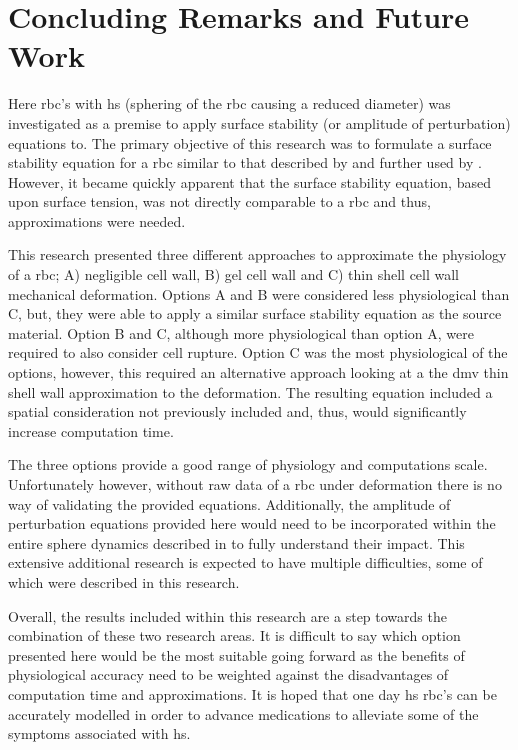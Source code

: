 \section{Concluding Remarks and Future Work}
Here \ac{rbc}'s with \acf{hs} (sphering of the \ac{rbc} causing a reduced diameter) was investigated as a premise to apply surface stability (or amplitude of perturbation) equations to. The primary objective of this research was to formulate a surface stability equation for a \ac{rbc} similar to that described by \citet{Prosperetti1974} and further used by \citet{Zeng2018}. However, it became quickly apparent that the surface stability equation, based upon surface tension, was not directly comparable to a \ac{rbc} and thus, approximations were needed.

This research presented three different approaches to approximate the physiology of a \ac{rbc}; A) negligible cell wall, B) gel cell wall and C) thin shell cell wall mechanical deformation. Options A and B were considered less physiological than C, but, they were able to apply a similar surface stability equation as the source material. Option B and C, although more physiological than option A, were required to also consider cell rupture. Option C was the most physiological of the options, however, this required an alternative approach looking at a the \acf{dmv} thin shell wall approximation to the deformation. The resulting equation included a spatial consideration not previously included and, thus, would significantly increase computation time.   

The three options provide a good range of physiology and computations scale. Unfortunately however, without raw data of a \ac{rbc} under deformation there is no way of validating the provided equations. Additionally, the amplitude of perturbation equations provided here would need to be incorporated within the entire sphere dynamics described in \citet{Zeng2018} to fully understand their impact. This extensive additional research is expected to have multiple difficulties, some of which were described in this research.   

Overall, the results included within this research are a step towards the combination of these two research areas. It is difficult to say which option presented here would be the most suitable going forward as the benefits of physiological accuracy need to be weighted against the disadvantages of computation time and approximations. It is hoped that one day \acf{hs} \ac{rbc}'s can be accurately modelled in order to advance medications to alleviate some of the symptoms associated with \ac{hs}.
